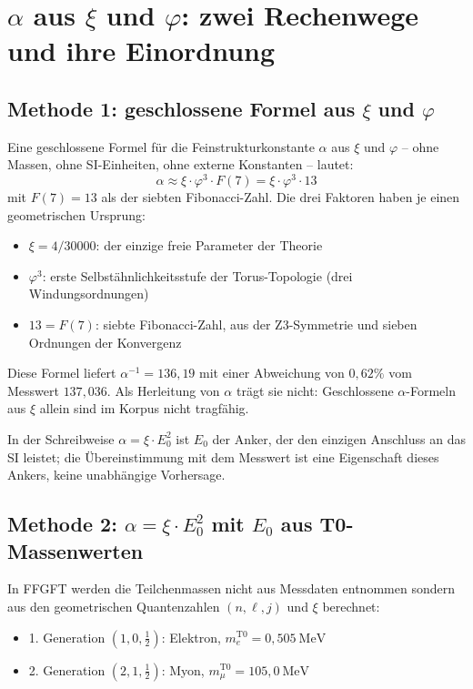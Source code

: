 \section{$\alpha$ aus $\xi$ und $\varphi$: zwei Rechenwege und ihre Einordnung}

\subsection{Methode 1: geschlossene Formel aus $\xi$ und $\varphi$}

Eine geschlossene Formel für die Feinstrukturkonstante $\alpha$ aus $\xi$ und $\varphi$ -- ohne Massen, ohne SI-Einheiten, ohne externe Konstanten -- lautet:
\begin{equation}
  \alpha \approx \xi \cdot \varphi^3 \cdot F(7) = \xi \cdot \varphi^3 \cdot 13
\end{equation}
mit $F(7) = 13$ als der siebten Fibonacci-Zahl. Die drei Faktoren haben je einen geometrischen Ursprung:
\begin{itemize}[noitemsep]
  \item $\xi = 4/30000$: der einzige freie Parameter der Theorie
  \item $\varphi^3$: erste Selbstähnlichkeitsstufe der Torus-Topologie (drei Windungsordnungen)
  \item $13 = F(7)$: siebte Fibonacci-Zahl, aus der Z3-Symmetrie und sieben Ordnungen der Konvergenz
\end{itemize}

Diese Formel liefert $\alpha^{-1} = 136{,}19$ mit einer Abweichung von $0{,}62\%$ vom Messwert $137{,}036$. Als Herleitung von $\alpha$ trägt sie nicht: Geschlossene $\alpha$-Formeln aus $\xi$ allein sind im Korpus nicht tragfähig.

\medskip
In der Schreibweise $\alpha = \xi \cdot E_0^2$ ist $E_0$ der Anker, der den einzigen Anschluss an das SI leistet; die Übereinstimmung mit dem Messwert ist eine Eigenschaft dieses Ankers, keine unabhängige Vorhersage.

\subsection{Methode 2: $\alpha = \xi \cdot E_0^2$ mit $E_0$ aus T0-Massenwerten}

In FFGFT werden die Teilchenmassen nicht aus Messdaten entnommen sondern aus den geometrischen Quantenzahlen $(n, \ell, j)$ und $\xi$ berechnet:
\begin{itemize}[noitemsep]
  \item 1. Generation $(1,0,\tfrac{1}{2})$: Elektron, $m_e^{\text{T0}} = 0{,}505\ \text{MeV}$
  \item 2. Generation $(2,1,\tfrac{1}{2})$: Myon, $m_\mu^{\text{T0}} = 105{,}0\ \text{MeV}$
\end{itemize}

